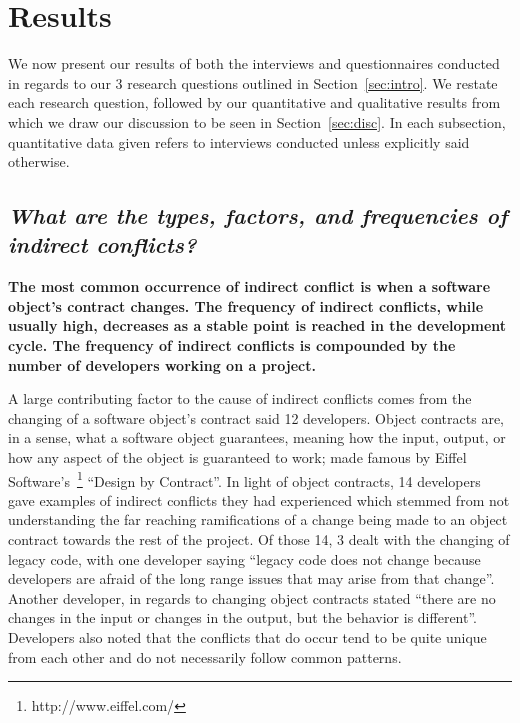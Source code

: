 \documentclass[conference]{IEEEtran}
\begin{document}
\section{Results}
\label{sec:results}

We now present our results of both the interviews and questionnaires conducted in regards to our 3 research questions
outlined in Section~\ref{sec:intro}. We restate each research question, followed by our quantitative and qualitative
results from which we draw our discussion to be seen in Section~\ref{sec:disc}. In each subsection, quantitative data
given refers to interviews conducted unless explicitly said otherwise.

{}
\subsection*{ \it{What are the types, factors, and frequencies of indirect conflicts?}}

\bf{The most common occurrence of indirect conflict is when a software object's contract changes. The frequency of
indirect conflicts, while usually high, decreases as a stable point is reached in the development cycle. The frequency
of indirect conflicts is compounded by the number of developers working on a project.}

\normalfont{}

A large contributing factor to the cause
of indirect conflicts comes from the changing of a software object's contract said 12 developers. Object contracts are, in a sense,
what a software object guarantees, meaning how the input, output, or how any aspect of the object is guaranteed
to work; made famous by Eiffel Software's~\footnote{http://www.eiffel.com/} ``Design by Contract''\texttrademark.
In light of object contracts, 14 developers gave examples of indirect conflicts they had experienced
which stemmed from not understanding the far reaching ramifications of a change being made to an object contract
towards the rest of the project. Of those 14, 3 dealt
with the changing of legacy code, with one developer saying ``legacy code does not change because developers
are afraid of the long range issues that may arise from that change''. Another developer, in regards to changing
object contracts stated ``there are no changes in the input or changes in the output, but the behavior is different''.
Developers also noted that the conflicts that do occur tend to be quite unique from each other and do not necessarily
follow common patterns.
\end{document}

